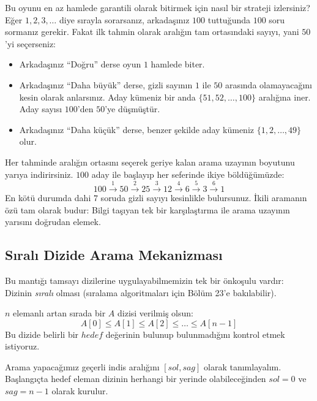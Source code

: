 Bu oyunu en az hamlede garantili olarak bitirmek için nasıl bir strateji izlersiniz?
Eğer $1, 2, 3, \dots$ diye sırayla sorarsanız, arkadaşınız $100$ tuttuğunda $100$ soru sormanız gerekir. Fakat ilk tahmin olarak aralığın tam ortasındaki sayıyı, yani $50$'yi seçerseniz:
\begin{itemize}
    \item Arkadaşınız ``Doğru'' derse oyun $1$ hamlede biter.
    \item Arkadaşınız ``Daha büyük'' derse, gizli sayının $1$ ile $50$ arasında olamayacağını kesin olarak anlarsınız. Aday kümeniz bir anda $\{51, 52, \dots, 100\}$ aralığına iner. Aday sayısı $100$'den $50$'ye düşmüştür.
    \item Arkadaşınız ``Daha küçük'' derse, benzer şekilde aday kümeniz $\{1, 2, \dots, 49\}$ olur.
\end{itemize}
Her tahminde aralığın ortasını seçerek geriye kalan arama uzayının boyutunu yarıya indirirsiniz. $100$ aday ile başlayıp her seferinde ikiye böldüğümüzde:
\[ 100 \xrightarrow{1} 50 \xrightarrow{2} 25 \xrightarrow{3} 12 \xrightarrow{4} 6 \xrightarrow{5} 3 \xrightarrow{6} 1 \]
En kötü durumda dahi $7$ soruda gizli sayıyı kesinlikle bulursunuz. İkili aramanın özü tam olarak budur: Bilgi taşıyan tek bir karşılaştırma ile arama uzayının yarısını doğrudan elemek.

\subsection{Sıralı Dizide Arama Mekanizması}

Bu mantığı tamsayı dizilerine uygulayabilmemizin tek bir önkoşulu vardır: Dizinin \emph{sıralı} olması (sıralama algoritmaları için Bölüm 23'e bakılabilir).

$n$ elemanlı artan sırada bir $A$ dizisi verilmiş olsun:
\[ A[0] \le A[1] \le A[2] \le \dots \le A[n-1] \]
Bu dizide belirli bir $hedef$ değerinin bulunup bulunmadığını kontrol etmek istiyoruz.

Arama yapacağımız geçerli indis aralığını $[sol, sag]$ olarak tanımlayalım. Başlangıçta hedef eleman dizinin herhangi bir yerinde olabileceğinden $sol = 0$ ve $sag = n - 1$ olarak kurulur.

